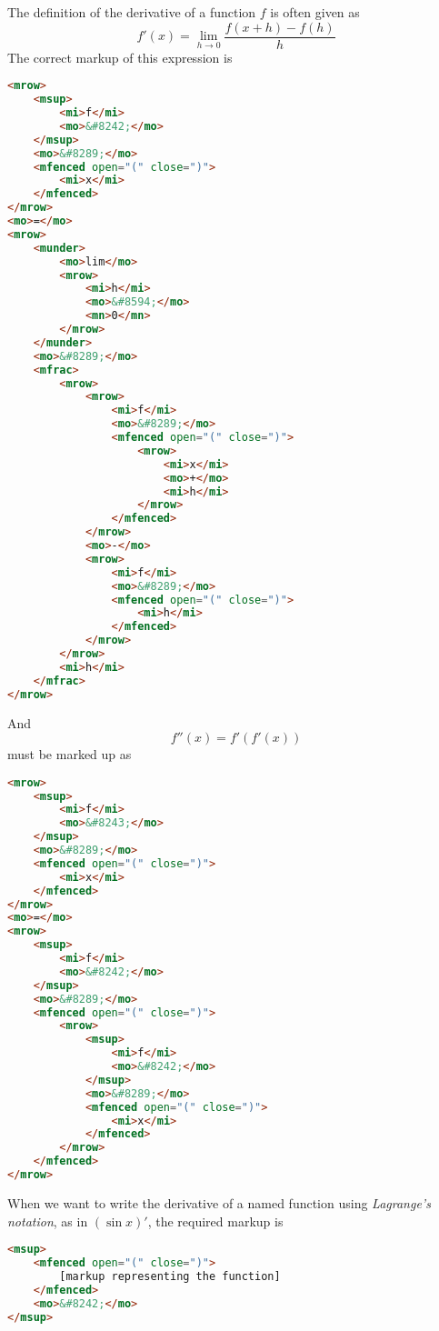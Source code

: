 \documentclass[english,a4paper,11pt]{article}
\begin{document}
\begin{examples}
The definition of the derivative of a function $f$ is often given as
\begin{equation}
f'(x) = \lim_{h \rightarrow 0} \frac{f(x+h) - f(h)}{h}
\end{equation}
The correct markup of this expression is 
\begin{lstlisting}[language=HTML]
<mrow>
	<msup>
		<mi>f</mi>
		<mo>&#8242;</mo>
	</msup>
	<mo>&#8289;</mo>
	<mfenced open="(" close=")">
		<mi>x</mi>
	</mfenced>
</mrow>
<mo>=</mo>
<mrow>
	<munder>
		<mo>lim</mo>
		<mrow>
			<mi>h</mi>
			<mo>&#8594;</mo>
			<mn>0</mn>
		</mrow>
	</munder>
	<mo>&#8289;</mo>
	<mfrac>
		<mrow>
			<mrow>
				<mi>f</mi>
				<mo>&#8289;</mo>
				<mfenced open="(" close=")">
					<mrow>
						<mi>x</mi>
						<mo>+</mo>
						<mi>h</mi>
					</mrow>
				</mfenced>
			</mrow>
			<mo>-</mo>
			<mrow>
				<mi>f</mi>
				<mo>&#8289;</mo>
				<mfenced open="(" close=")">
					<mi>h</mi>
				</mfenced>
			</mrow>
		</mrow>
		<mi>h</mi>
	</mfrac>
</mrow>
\end{lstlisting}
And
\begin{equation}
f''(x) = f'(f'(x))
\end{equation}
must be marked up as
\begin{lstlisting}[language=HTML]
<mrow>
	<msup>
		<mi>f</mi>
		<mo>&#8243;</mo>
	</msup>
	<mo>&#8289;</mo>
	<mfenced open="(" close=")">
		<mi>x</mi>
	</mfenced>
</mrow>
<mo>=</mo>
<mrow>
	<msup>
		<mi>f</mi>
		<mo>&#8242;</mo>
	</msup>
	<mo>&#8289;</mo>
	<mfenced open="(" close=")">
		<mrow>
			<msup>
				<mi>f</mi>
				<mo>&#8242;</mo>
			</msup>
			<mo>&#8289;</mo>
			<mfenced open="(" close=")">
				<mi>x</mi>
			</mfenced>
		</mrow>
	</mfenced>
</mrow>
\end{lstlisting}

\end{examples}

\bigskip
When we want to write the derivative of a named function using \emph{Lagrange's notation}, as in $(\sin x)'$, the required markup is

\begin{lstlisting}[language=HTML]
<msup>
	<mfenced open="(" close=")">
		[markup representing the function]
	</mfenced>
	<mo>&#8242;</mo>
</msup>
\end{lstlisting}
\end{document}
